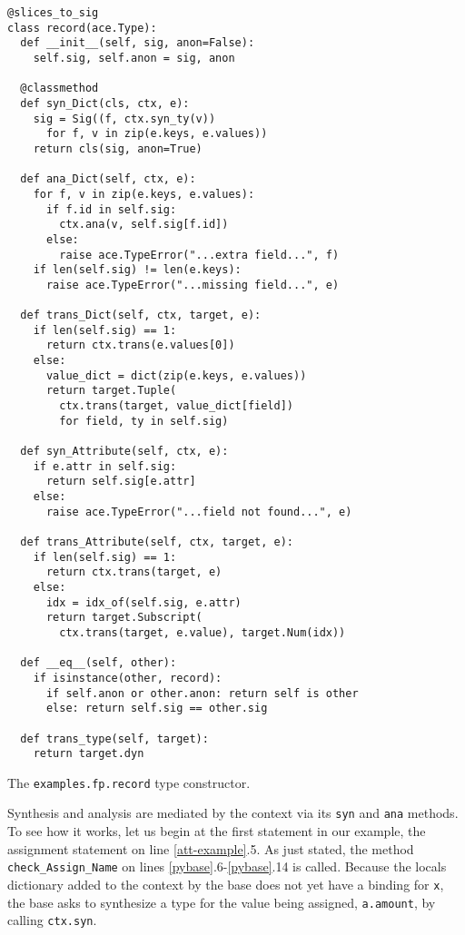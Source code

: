 \documentclass[10pt,preprint]{sigplanconf}
\begin{document}
{\begin{codelisting}
\begin{lstlisting}
@slices_to_sig
class record(ace.Type):
  def __init__(self, sig, anon=False):
    self.sig, self.anon = sig, anon
    
  @classmethod 
  def syn_Dict(cls, ctx, e):
    sig = Sig((f, ctx.syn_ty(v)) 
      for f, v in zip(e.keys, e.values))
    return cls(sig, anon=True)
    
  def ana_Dict(self, ctx, e):
    for f, v in zip(e.keys, e.values):
      if f.id in self.sig:
        ctx.ana(v, self.sig[f.id])
      else:
        raise ace.TypeError("...extra field...", f)
    if len(self.sig) != len(e.keys):
      raise ace.TypeError("...missing field...", e)
      
  def trans_Dict(self, ctx, target, e):
    if len(self.sig) == 1:
      return ctx.trans(e.values[0])
    else:
      value_dict = dict(zip(e.keys, e.values))
	  return target.Tuple(
	    ctx.trans(target, value_dict[field])
	    for field, ty in self.sig)

  def syn_Attribute(self, ctx, e): 
    if e.attr in self.sig: 
      return self.sig[e.attr]
    else:
      raise ace.TypeError("...field not found...", e)
      
  def trans_Attribute(self, ctx, target, e): 
    if len(self.sig) == 1:
      return ctx.trans(target, e)
    else:
      idx = idx_of(self.sig, e.attr)
      return target.Subscript(
        ctx.trans(target, e.value), target.Num(idx))
        
  def __eq__(self, other):
    if isinstance(other, record): 
      if self.anon or other.anon: return self is other
      else: return self.sig == other.sig

  def trans_type(self, target):
    return target.dyn
\end{lstlisting}
%
\caption{The \texttt{examples.fp.record} type constructor.}
\label{record}
\end{codelisting}
 Synthesis and analysis are mediated by the context via its \verb|syn| and \verb|ana| methods. To see how it works, let us begin at the first statement in our example, the assignment statement on line \ref{att-example}.5. As just stated, the method \verb|check_Assign_Name| on lines \ref{pybase}.6-\ref{pybase}.14 is called. Because the locals dictionary added to the context by the base does not yet have a binding for \verb|x|, the base asks to synthesize a type for the value being assigned, \verb|a.amount|, by calling \verb|ctx.syn|.

}
\end{document}

